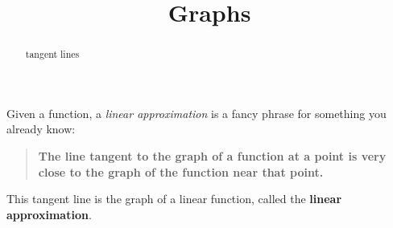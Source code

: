 \documentclass{ximera}
\title{Graphs}
\begin{document}
\begin{abstract}
tangent lines
\end{abstract}
\maketitle


Given a function, a \textit{linear approximation} is a fancy phrase
for something you already know:
\begin{quote}
  \textbf{The line tangent to the graph of a function at a point is very close to the graph of the function near that point.}
\end{quote}
This tangent line is the graph of a linear function, called  the \textbf{\textcolor{blue!55!black}{linear approximation}}.
\end{document}
